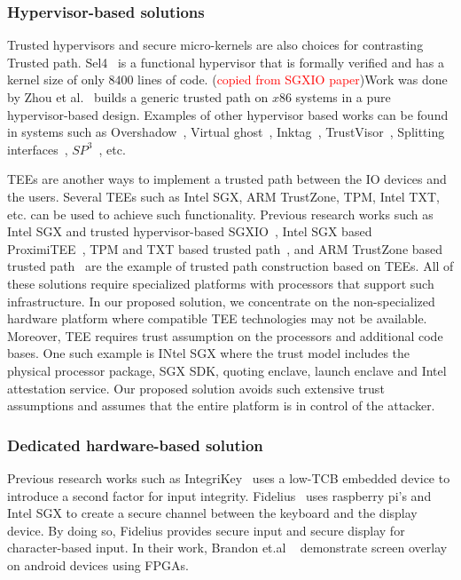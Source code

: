 \subsubsection{Hypervisor-based solutions} Trusted hypervisors and secure micro-kernels are also choices for contrasting Trusted path. Sel4~\cite{klein2009sel4} is a functional hypervisor that is formally verified and has a kernel size of only $8400$ lines of code. (\textcolor{red}{copied from SGXIO paper})Work was done by Zhou et al.~\cite{zhou2012building} builds a generic trusted path on $x86$ systems in a pure hypervisor-based design. Examples of other hypervisor based works can be found in systems such as Overshadow~\cite{Overshadow}, Virtual ghost~\cite{criswell2014virtual}, Inktag~\cite{hofmann2013inktag}, TrustVisor~\cite{mccune2010trustvisor}, Splitting interfaces~\cite{ta2006splitting}, $SP^3$~\cite{yang2008using}, etc.

 TEEs are another ways to implement a trusted path between the IO devices and the users. Several TEEs such as Intel SGX, ARM TrustZone, TPM, Intel TXT, etc. can be used to achieve such functionality. Previous research works such as Intel SGX and trusted hypervisor-based SGXIO~\cite{weiser2017sgxio}, Intel SGX based ProximiTEE~\cite{dhar2018proximitee}, TPM and TXT based trusted path~\cite{filyanov2011uni}, and ARM TrustZone based trusted path~\cite{filyanov2011uni,sun2015trustotp} are the example of trusted path construction based on TEEs. All of these solutions require specialized platforms with processors that support such infrastructure. In our proposed solution, we concentrate on the non-specialized hardware platform where compatible TEE technologies may not be available.
Moreover, TEE requires trust assumption on the processors and additional code bases. One such example is INtel SGX where the trust model includes the physical processor package, SGX SDK, quoting enclave, launch enclave and Intel attestation service. Our proposed solution avoids such extensive trust assumptions and assumes that the entire platform is in control of the attacker.


\subsubsection{Dedicated hardware-based solution} Previous research works such as IntegriKey~\cite{IntegriKey} uses a low-TCB embedded device to introduce a second factor for input integrity. Fidelius~\cite{Fidelius} uses raspberry pi's and Intel SGX to create a secure channel between the keyboard and the display device. By doing so, Fidelius provides secure input and secure display for character-based input. In their work, Brandon et.al ~\cite{brandon2017trusted} demonstrate screen overlay on android devices using FPGAs.

